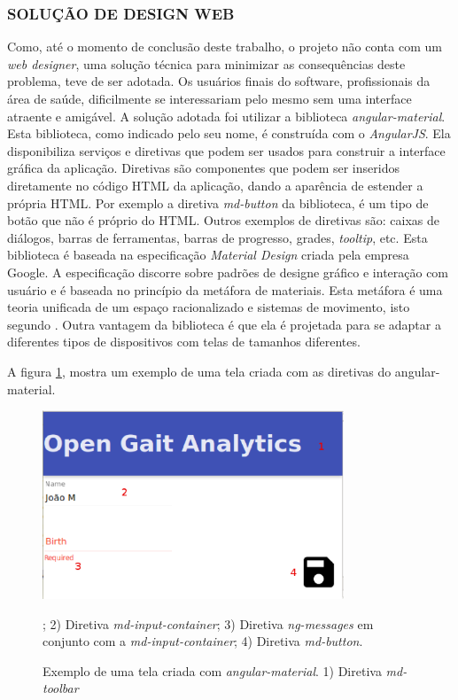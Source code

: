 \subsubsection[SOLUÇÃO DE DESIGN WEB]{SOLUÇÃO DE DESIGN WEB}
Como, até o momento de conclusão deste trabalho, o projeto não conta com um \emph{web designer}, uma solução técnica para minimizar as consequências deste problema, teve de ser adotada. Os usuários finais do software, profissionais da área de saúde, dificilmente se interessariam pelo mesmo sem uma interface atraente e amigável.
A solução adotada foi utilizar a biblioteca \emph{angular-material}. 
Esta biblioteca, como indicado pelo seu nome, é construída com o \emph{AngularJS}. 
Ela disponibiliza serviços e diretivas que podem ser usados para construir a interface gráfica da aplicação. 
Diretivas são componentes que podem ser inseridos diretamente no código HTML da aplicação, dando a aparência de estender a própria HTML. 
Por exemplo a diretiva \emph{md-button} da biblioteca, é um tipo de botão que não é próprio do HTML. 
Outros exemplos de diretivas são: caixas de diálogos, barras de ferramentas, barras de progresso, grades, \emph{tooltip}, etc. 
Esta biblioteca é baseada na especificação \emph{Material Design} criada pela empresa Google. 
A especificação discorre sobre padrões de designe gráfico e interação com usuário e é baseada no princípio da metáfora de materiais. 
Esta metáfora é uma teoria unificada de um espaço racionalizado e sistemas de movimento, isto segundo \cite{Google2015a}. Outra vantagem da biblioteca é que ela é projetada para se adaptar a diferentes tipos de dispositivos com telas de tamanhos diferentes.

A figura \ref{material_amostra}, mostra um exemplo de uma tela criada com as diretivas do angular-material.

\begin{figure}[ht]
	\centering
	\includegraphics[width=9cm]{figuras/material_amostra.eps}
	\caption[Exemplo de uma tela criada com \emph{angular-material}.]{Exemplo de uma tela criada com \emph{angular-material}. 1) Diretiva \emph{md-toolbar}}; 2) Diretiva \emph{md-input-container}; 3) Diretiva \emph{ng-messages} em conjunto com a \emph{md-input-container}; 4) Diretiva \emph{md-button}.
	\label{material_amostra}
\end{figure}

